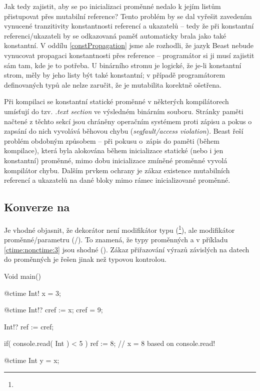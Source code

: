 Jak tedy zajistit, aby se po inicializaci proměnné  nedalo k jejím listům přistupovat přes mutabilní reference? Tento problém by se dal vyřešit zavedením vynucené tranzitivity konstantnosti referencí a ukazatelů -- tedy že při konstantní referenci/ukazateli by se odkazovaná paměť automaticky brala jako také konstantní. V oddílu \ref{constPropagation} jsme ale rozhodli, že jazyk Beast nebude vynucovat propagaci konstantnosti přes reference -- programátor si ji musí zajistit sám tam, kde je to potřeba. U binárního stromu je logické, že je-li konstantní strom, měly by jeho listy být také konstantní; v případě programátorem definovaných typů ale nelze zaručit, že je mutabilita korektně ošetřena.

Při kompilaci se konstantní statické proměnné v některých kompilátorech umísťují do tzv. \textit{.text section} ve výsledném binárním souboru. Stránky paměti načtené z těchto sekcí jsou chráněny operačním systémem proti zápisu a pokus o zapsání do nich vyvolává běhovou chybu (\textit{segfault/access violation}). Beast řeší problém obdobným způsobem -- při pokusu o~zápis do paměti (během kompilace), která byla alokována během inicializace statické \ctime (nebo i jen konstantní) proměnné, mimo dobu inicializace zmíněné proměnné vyvolá kompilátor chybu. Dalším prvkem ochrany je zákaz existence mutabilních referencí a ukazatelů na dané bloky mimo rámec inicializované proměnné.

\subsection{Konverze na \nonctime}
Je vhodné objasnit, že dekorátor  není modifikátor typu (\footnote{}), ale modifikátor proměnné/parametru (/). To znamená, že typy proměnných  a  v příkladu \ref{ctime:nonctime:3} jsou shodné (). Zákaz přiřazování výrazů závislých na \nonctime datech do \ctime proměnných je řešen jinak než typovou kontrolou.

\begin{code}[\label{ctime:nonctime:3}]
Void main() {
	@ctime Int! x = 3;
	
	@ctime Int!? cref := x;
	cref = 9; $\label{ctime:nonctime:1}$
	
	Int!? ref := cref; $\label{ctime:nonctime:2}$
	
	if( console.read( Int ) < 5 )
		ref := 8; // x = 8 based on console.read!
		
	@ctime Int y = x;
}
\end{code}

